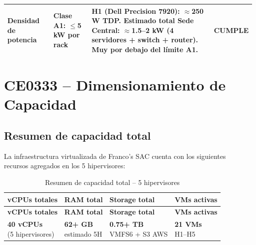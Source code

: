 \documentclass[11pt, a4paper, oneside]{report}
\begin{document}
\begin{xltabular}{\textwidth}{@{}|L{3cm}|L{3.6cm}|X|C{2cm}|@{}}
{\small \textbf{Densidad de potencia}} & {\small Clase A1: $\leq$5 kW por rack} & {\small H1 (Dell Precision 7920): $\approx$250 W TDP. Estimado total Sede Central: $\approx$1.5--2 kW (4 servidores + switch + router). Muy por debajo del límite A1.} & {\small \textcolor{sev_bajo}{\textbf{CUMPLE}}} \\ \hline

\end{xltabular}
\normalsize

\chapter{CE0333 -- Dimensionamiento de Capacidad}


\section{Resumen de capacidad total}

La infraestructura virtualizada de Franco's SAC cuenta con los siguientes recursos agregados en los 5 hipervisores:

\renewcommand{\arraystretch}{1.3}
\footnotesize

\begin{xltabular}{\textwidth}{@{}|C{3.5cm}|C{3cm}|C{3cm}|C{3.5cm}|@{}}
\caption{Resumen de capacidad total -- 5 hipervisores}
\label{tab:resumen_capacidad} \\

\parbox[c][1.1cm][c]{\linewidth}{\centering\color{white}\bfseries\small vCPUs totales} &
\parbox[c][1.1cm][c]{\linewidth}{\centering\color{white}\bfseries\small RAM total} &
\parbox[c][1.1cm][c]{\linewidth}{\centering\color{white}\bfseries\small Storage total} &
\parbox[c][1.1cm][c]{\linewidth}{\centering\color{white}\bfseries\small VMs activas} \\ \hline
\endfirsthead

\parbox[c][1.1cm][c]{\linewidth}{\centering\color{white}\bfseries\small vCPUs totales} &
\parbox[c][1.1cm][c]{\linewidth}{\centering\color{white}\bfseries\small RAM total} &
\parbox[c][1.1cm][c]{\linewidth}{\centering\color{white}\bfseries\small Storage total} &
\parbox[c][1.1cm][c]{\linewidth}{\centering\color{white}\bfseries\small VMs activas} \\ \hline
\endhead

\hline
\endfoot

{\small \textbf{40 vCPUs} \newline (5 hipervisores)} &
{\small \textbf{62+ GB} \newline estimado 5H} &
{\small \textbf{0.75+ TB} \newline VMFS6 + S3 AWS} &
{\small \textbf{21 VMs} \newline H1--H5} \\ \hline

\end{xltabular}
\normalsize
\end{document}
